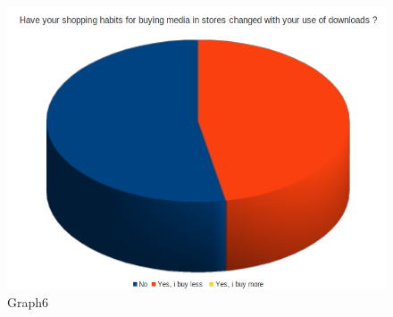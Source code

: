 \documentclass[a4paper]{article}
\begin{document}
\begin{figure}[htbp]
  \centering
  \includegraphics[scale=0.40]{graph6}
  \caption{Graph6}
  \label{fig:Graph6}
\end{figure}
\end{document}

